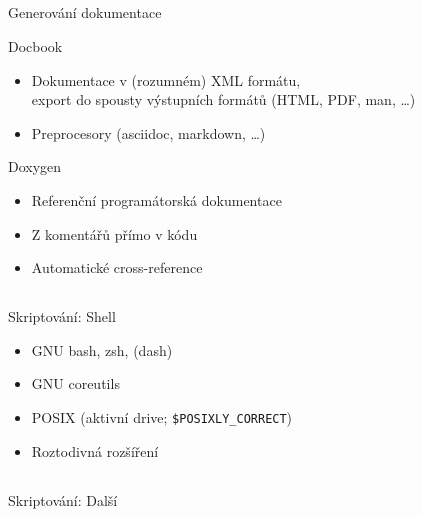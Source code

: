 \documentclass{beamer}
\begin{document}
\subsection{}
\begin{frame}{Generování dokumentace}
\begin{center}
\begin{block}{Docbook}
\begin{itemize}
\item Dokumentace v (rozumném) XML formátu, \\ export do spousty výstupních formátů (HTML, PDF, man, \dots)
\item Preprocesory (asciidoc, markdown, \dots)
\end{itemize}
\end{block}
\begin{block}{Doxygen}
\begin{itemize}
\item Referenční programátorská dokumentace
\item Z komentářů přímo v kódu
\item Automatické cross-reference
\end{itemize}
\end{block}
\end{center}
\end{frame}

\subsection{}
\begin{frame}{Skriptování: Shell}
\begin{itemize}
\item GNU bash, zsh, (dash)
\item GNU coreutils
\item POSIX (aktivní drive; {\tt \$POSIXLY\_CORRECT})
\item Roztodivná rozšíření
\end{itemize}
\end{frame}

\subsection{}
\begin{frame}{Skriptování: Další}
\end{frame}
\end{document}
